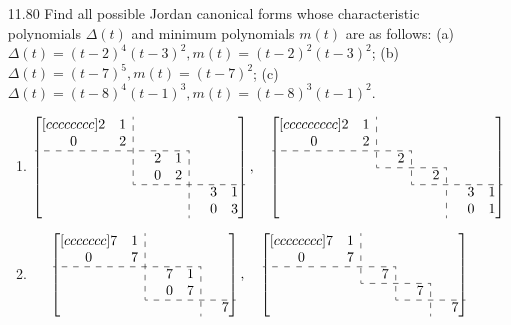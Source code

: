\documentclass[12pt]{article}
\newcommand*{\tempb}{\multicolumn{1}{:c}{}} %
\theoremstyle{definition}
\theoremstyle{plain}
\begin{document}
\begin{enumerate}
\item[11.80]Find all possible Jordan canonical forms whose characteristic polynomials $\Delta (t)$ and minimum polynomials $m(t)$ are as follows: (a) $\Delta (t)=(t-2)^4(t-3)^2,m(t)=(t-2)^2(t-3)^2$; (b) $\Delta (t)=(t-7)^5,m(t)=(t-7)^2$; (c) $\Delta (t) =(t-8)^4(t-1)^3,m(t)=(t-8)^3(t-1)^2$.
	\begin{enumerate}
	\item 
	\[ \begin{bmatrix}[cccccccc]
	2&1&\tempb&{}&{}&{}&{}&{}\\
	0&2&\tempb&{}&{}&{}&{}&{}\\
	\cdashline{1-5} 
	{}&{}&\tempb&2&1&\tempb&{}&{}\\
	{}&{}&\tempb&0&2&\tempb&{}&{}\\
	\cdashline{3-8} 
	{}&{}&{}&{}&{}&\tempb&3&1\\
	{}&{}&{}&{}&{}&\tempb&0&3\\
	\end{bmatrix}, \quad \begin{bmatrix}[ccccccccc]
	2&1&\tempb&{}&{}&{}&{}&{}&{}\\
	0&2&\tempb&{}&{}&{}&{}&{}&{}\\
	\cdashline{1-4}
	{}&{}&\tempb&2&\tempb&{}&{}&{}&{}\\
	\cdashline{3-6}
	{}&{}&{}&{}&\tempb&2&\tempb&{}&{}\\
	\cdashline{5-9}
	{}&{}&{}&{}&{}&{}&\tempb&3&1\\
	{}&{}&{}&{}&{}&{}&\tempb&0&1\\\end{bmatrix} \]
	\item
	\[ \begin{bmatrix}[ccccccc]
	7&1&\tempb&{}&{}&{}&{}\\
	0&7&\tempb&{}&{}&{}&{}\\
	\cdashline{1-5}
	{}&{}&\tempb&7&1&\tempb&{}\\
	{}&{}&\tempb&0&7&\tempb&{}\\
	\cdashline{3-7}
	{}&{}&{}&{}&{}&\tempb&7\\\end{bmatrix}, \quad
	\begin{bmatrix}[cccccccc]
	7&1&\tempb&{}&{}&{}&{}&{}\\
	0&7&\tempb&{}&{}&{}&{}&{}\\
	\cdashline{1-4}
	{}&{}&\tempb&7&\tempb&{}&{}&{}\\
	\cdashline{3-6}
	{}&{}&{}&{}&\tempb&7&\tempb&{}\\
	\cdashline{5-8}
	{}&{}&{}&{}&{}&{}&\tempb&7\\\end{bmatrix} \]


\end{enumerate}
\end{enumerate}
\end{document}

